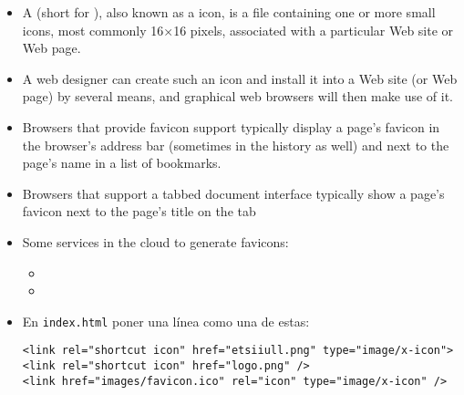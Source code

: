 
\begin{itemize}
\item
A  (short for ), also known as a  
icon, is a file containing one or more small icons, 
most commonly 16×16 pixels, associated with a particular
Web site or Web page.
\item
A web designer can create such an icon and
install it into a Web site (or Web page) by several means, and graphical
web browsers will then make use of it. 
\item
Browsers that provide favicon
support typically display a page's favicon in the browser's address bar
(sometimes in the history as well) and next to the page's name in a
list of bookmarks.
\item
Browsers that support a tabbed document interface
typically show a page's favicon next to the page's title on the tab
\item
Some services in the cloud to generate favicons:
  \begin{itemize}
  \item
  \item
  \end{itemize}
\item
En \verb|index.html| poner una línea como una de estas:
\begin{verbatim}
<link rel="shortcut icon" href="etsiiull.png" type="image/x-icon"> 
<link rel="shortcut icon" href="logo.png" /> 
<link href="images/favicon.ico" rel="icon" type="image/x-icon" />
\end{verbatim}
\end{itemize}

